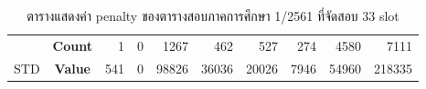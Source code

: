 \begin{table}[]
{\begin{tabular}{@{}ccrrrrrrrr@{}}
    {\color[HTML]{FE0000} }                      & {\color[HTML]{FE0000} \textbf{Count}} & {\color[HTML]{FE0000} 1}       & {\color[HTML]{FE0000} 0}       & {\color[HTML]{FE0000} 1267}    & {\color[HTML]{FE0000} 462}     & {\color[HTML]{FE0000} 527}     & {\color[HTML]{FE0000} 274}     & {\color[HTML]{FE0000} 4580}    & {\color[HTML]{FE0000} 7111}      \\ \cmidrule(l){2-10} 
    \multirow{-2}{*}{{\color[HTML]{FE0000} STD}} & {\color[HTML]{FE0000} \textbf{Value}} & {\color[HTML]{FE0000} 541}     & {\color[HTML]{FE0000} 0}       & {\color[HTML]{FE0000} 98826}   & {\color[HTML]{FE0000} 36036}   & {\color[HTML]{FE0000} 20026}   & {\color[HTML]{FE0000} 7946}    & {\color[HTML]{FE0000} 54960}   & {\color[HTML]{FE0000} 218335}    \\ \bottomrule
    \end{tabular}%
    }
    \caption{ตารางแสดงค่า penalty ของตารางสอบภาคการศึกษา 1/2561 ที่จัดสอบ 33 slot}
    \label{tab:result_table_161_33}
\end{table}
